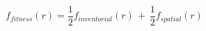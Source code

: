 
\begin{equation} 
\label{eq:fitness_func}
f_{fitness}(r) = \frac{1}{2}f_{inventorial}(r) \,+ \, \frac{1}{2}f_{spatial}(r)
\end{equation}




